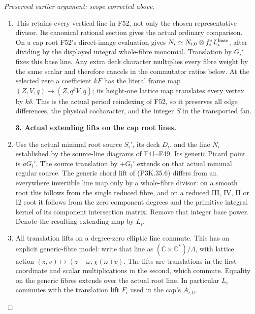\begin{proof}[Preserved earlier argument; scope corrected above]
\begin{enumerate}[label=\arabic*.]
\item This retains every vertical line in F52, not only the chosen
representative divisor. Its canonical rational section gives the
actual ordinary comparison. On a cap root F52's direct-image
evaluation gives \(N_i\simeq N_{i,0}\otimes f_i^*L_i^{\rm base}\),
after dividing by the displayed integral whole-fibre monomial.
Translation by \(G_i'\) fixes this base line. Any extra deck
character multiplies every fibre weight by the same scalar and
therefore cancels in the commutator ratios below. At the selected
zero a coefficient \(kF\) has the literal frame map
\((Z,V,q)\mapsto(Z,q^kV,q)\); its height-one lattice map translates
every vertex by \(k\delta\). This is the actual period reindexing
of F52, so it preserves all edge differences, the physical
cocharacter, and the integer \(S\) in the transported fan.

\par\medskip\noindent\textbf{3. Actual extending lifts on the cap root lines.}\enspace

\item Use the actual minimal root source \(S_i'\), its deck \(D_i\), and
the line \(N_i\) established by the source-line diagrams of F41--F49.
Its generic Picard point is \(aG_i'\). The source translation by
\(+G_i'\) extends on that actual minimal regular source. The generic
chord lift of (P3K.35.6) differs from an everywhere invertible line map
only by a whole-fibre divisor: on a smooth root this follows from
the single reduced fibre, and on a reduced III, IV, II or I2 root
it follows from the zero component degrees and the primitive integral
kernel of its component intersection matrix. Remove that integer
base power. Denote the resulting extending map by \(L_i\).

\item All translation lifts on a degree-zero elliptic line commute. This
has an explicit generic-fibre model: write that line as
\((\mathbb C\times\mathbb C^*)/\Lambda\), with lattice action
\((z,v)\mapsto(z+\omega,\chi(\omega)v)\). The lifts are translations
in the first coordinate and scalar multiplications in the second,
which commute. Equality on the generic fibres extends over the actual
root line. In particular \(L_i\) commutes with the translation lift
\(F_i\) used in the cap's \(A_{i,0}\).


\end{enumerate}
\end{proof}
